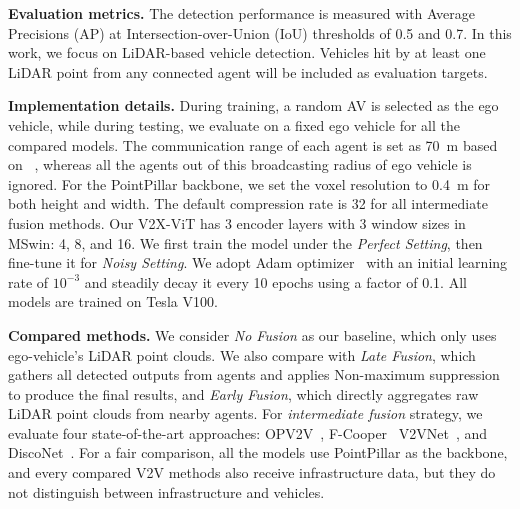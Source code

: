 \documentclass[runningheads]{llncs}
\begin{document}
\noindent\textbf{Evaluation metrics.} 
The detection performance is measured with Average Precisions (AP) at Intersection-over-Union (IoU) thresholds of 0.5 and 0.7. In this work, we focus on LiDAR-based vehicle detection. Vehicles hit by at least one LiDAR point from any connected agent will be included as evaluation targets.

\noindent\textbf{Implementation details.}
During training, a random AV is selected as the ego vehicle, while during testing, we evaluate on a fixed ego vehicle for all the compared models.  The communication range of each agent is set as 70~m based on ~\cite{kenney2011dedicated}, whereas all the agents out of this broadcasting radius of ego vehicle is ignored. For the PointPillar backbone, we set the voxel resolution to 0.4~m for both height and width. The default compression rate is 32 for all intermediate fusion methods. Our V2X-ViT has 3 encoder layers with 3 window sizes in MSwin: 4, 8, and 16. We first train the model under the \textit{Perfect Setting}, then fine-tune it for \textit{Noisy Setting}. We adopt Adam optimizer~\cite{kingma2014adam} with an initial learning rate of $10^{-3}$ and steadily decay it every 10 epochs using a factor of 0.1. All models are trained on Tesla V100.

\noindent\textbf{Compared methods.} We consider \textit{No Fusion} as our baseline, which only uses ego-vehicle's LiDAR point clouds.
We also compare with \textit{Late Fusion}, which gathers all detected outputs from agents and applies Non-maximum suppression to produce the final results, and \textit{Early Fusion}, which directly aggregates raw LiDAR point clouds from nearby agents. For \textit{intermediate fusion} strategy, we evaluate four state-of-the-art approaches: OPV2V~\cite{xu2021opv2v}, F-Cooper~\cite{chen2019f} V2VNet~\cite{wang2020v2vnet}, and DiscoNet~\cite{li2021learning}.
For a fair comparison, all the models use PointPillar as the backbone, and every compared V2V methods also receive infrastructure data, but they do not distinguish between infrastructure and vehicles.
\end{document}
